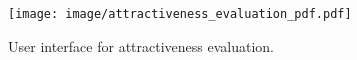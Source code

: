 \begin{figure}[t]
 \centering
  \texttt{[image: image/attractiveness\_evaluation\_pdf.pdf]}
 \caption{User interface for attractiveness evaluation.}
 \label{fig:user_interface_attractiveness_eval}
\end{figure}